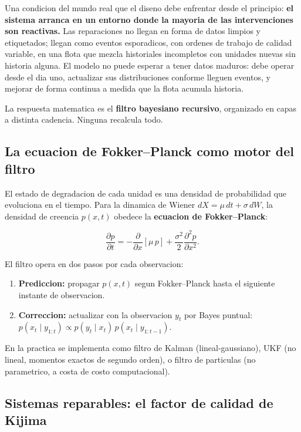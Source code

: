 \documentclass[11pt,a4paper]{article}
\begin{document}
Una condicion del mundo real que el diseno debe enfrentar desde el principio:
\textbf{el sistema arranca en un entorno donde la mayoria de las
intervenciones son reactivas.} Las reparaciones no llegan en forma de
datos limpios y etiquetados; llegan como eventos esporadicos, con ordenes
de trabajo de calidad variable, en una flota que mezcla historiales
incompletos con unidades nuevas sin historia alguna. El modelo no puede
esperar a tener datos maduros: debe operar desde el dia uno, actualizar
sus distribuciones conforme lleguen eventos, y mejorar de forma continua
a medida que la flota acumula historia.

La respuesta matematica es el \textbf{filtro bayesiano recursivo},
organizado en capas a distinta cadencia. Ninguna recalcula todo.

\subsection{La ecuacion de Fokker--Planck como motor del filtro}

El estado de degradacion de cada unidad es una densidad de probabilidad
que evoluciona en el tiempo. Para la dinamica de Wiener
$dX = \mu\,dt + \sigma\,dW$, la densidad de creencia $p(x,t)$ obedece
la \textbf{ecuacion de Fokker--Planck}:

$$\frac{\partial p}{\partial t} =
  -\frac{\partial}{\partial x}[\mu\,p]
  + \frac{\sigma^2}{2}\frac{\partial^2 p}{\partial x^2}.$$

El filtro opera en dos pasos por cada observacion:

\begin{enumerate}
  \item \textbf{Prediccion:} propagar $p(x,t)$ segun Fokker--Planck
    hasta el siguiente instante de observacion.
  \item \textbf{Correccion:} actualizar con la observacion $y_t$ por
    Bayes puntual:
    $p(x_t \mid y_{1:t}) \propto p(y_t \mid x_t)\,p(x_t \mid y_{1:t-1})$.
\end{enumerate}

En la practica se implementa como filtro de Kalman (lineal-gaussiano),
UKF (no lineal, momentos exactos de segundo orden), o filtro de particulas
(no parametrico, a costa de costo computacional).

\subsection{Sistemas reparables: el factor de calidad de Kijima}
\end{document}
